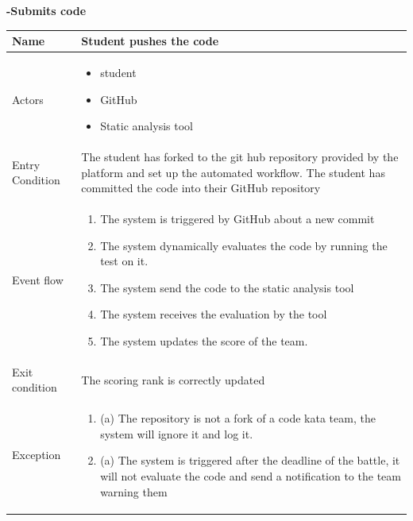 \begin{enumerate}[label=\textbf{[UC\arabic*]}]
 \item  \textbf{-Submits code}
    \\ \begin{tabular}{|l|p{11cm}|}
        \hline
        Name & Student pushes the code \\
        \hline
        Actors & \begin{itemize}
                    \item student
                    \item GitHub
                    \item Static analysis tool
                \end{itemize} \\
        \hline
        Entry Condition & The student has forked to the git hub repository provided by the platform and set up the automated workflow. The student has committed the code into their GitHub repository\\
        \hline
        Event flow & \begin{enumerate}
            \item The system is triggered by GitHub about a new commit
            \item The system dynamically evaluates the code by running the test on it.
            \item The system send the code to the static analysis tool 
            \item The system receives the evaluation by the tool
            \item The system updates the score of the team.
        \end{enumerate}\\
        \hline
        Exit condition &   The scoring rank is correctly updated\\
        \hline
        Exception & \begin{enumerate} [label={}, leftmargin=0.25cm ]
             \item (a) The repository is not a fork of a code kata team, the system will ignore it and log it.
            \item (a) The system is triggered after the deadline of the battle, it will not evaluate the code and send a notification to the team warning them 
           

\end{enumerate}
\end{tabular}
\end{enumerate}
